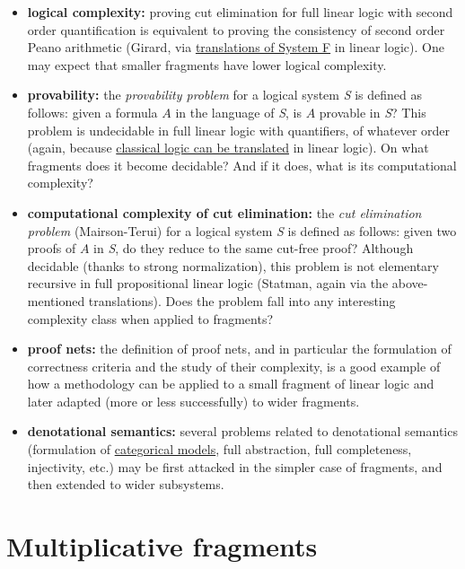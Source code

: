 \begin{itemize}
\tightlist
\item
  \textbf{logical complexity:} proving cut elimination for full linear
  logic with second order quantification is equivalent to proving the
  consistency of second order Peano arithmetic (Girard, via
  \href{Translations_of_intuitionistic_logic}{translations of System F}
  in linear logic). One may expect that smaller fragments have lower
  logical complexity.
\item
  \textbf{provability:} the \emph{provability problem} for a logical
  system \emph{S} is defined as follows: given a formula \(A\) in the
  language of \emph{S}, is \(A\) provable in \emph{S}? This problem is
  undecidable in full linear logic with quantifiers, of whatever order
  (again, because \href{Translations_of_classical_logic}{classical logic
  can be translated} in linear logic). On what fragments does it become
  decidable? And if it does, what is its computational complexity?
\item
  \textbf{computational complexity of cut elimination:} the \emph{cut
  elimination problem} (Mairson-Terui) for a logical system \emph{S} is
  defined as follows: given two proofs of \(A\) in \emph{S}, do they
  reduce to the same cut-free proof? Although decidable (thanks to
  strong normalization), this problem is not elementary recursive in
  full propositional linear logic (Statman, again via the
  above-mentioned translations). Does the problem fall into any
  interesting complexity class when applied to fragments?
\item
  \textbf{proof nets:} the definition of proof nets, and in particular
  the formulation of correctness criteria and the study of their
  complexity, is a good example of how a methodology can be applied to a
  small fragment of linear logic and later adapted (more or less
  successfully) to wider fragments.
\item
  \textbf{denotational semantics:} several problems related to
  denotational semantics (formulation of
  \href{Categorical_semantics}{categorical models}, full abstraction,
  full completeness, injectivity, etc.) may be first attacked in the
  simpler case of fragments, and then extended to wider subsystems.
\end{itemize}

\section{Multiplicative fragments}\label{multiplicative-fragments}

